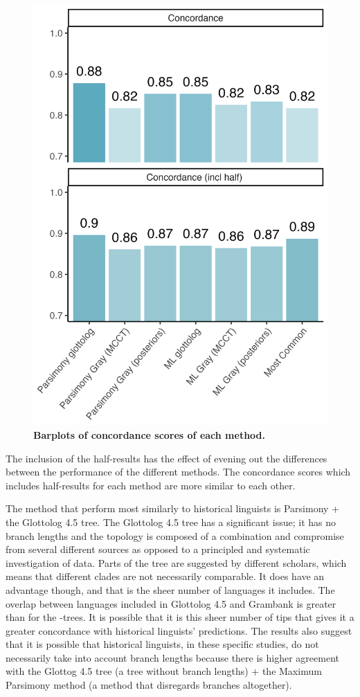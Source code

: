 \documentclass[12pt,letterpaper]{article}
\begin{document}
\begin{figure}[ht]
\centering
\includegraphics[width=12cm]{illustrations/plots_from_R/results/barplot_facet_scores_exclude_f1.png}
\caption{\textbf{Barplots of concordance scores of each method.}}
\label{barplot_facet_results}
\end{figure}

The inclusion of the half-results has the effect of evening out the differences between the performance of the different methods. The concordance scores which includes half-results for each method are more similar to each other.

The method that perform most similarly to historical linguists is Parsimony + the Glottolog 4.5 tree. The Glottolog 4.5 tree has a significant issue; it has no branch lengths and the topology is composed of a combination and compromise from several different sources as opposed to a principled and systematic investigation of  data. Parts of the tree are suggested by different scholars, which means that different clades are not necessarily comparable. It does have an advantage though, and that is the sheer number of languages it includes. The overlap between languages included in Glottolog 4.5 and Grambank is greater than for the \citet{grayetal_2009}-trees. It is possible that it is this sheer number of tips that gives it a greater concordance with historical linguists' predictions. The results also suggest that it is possible that historical linguists, in these specific studies, do not necessarily take into account branch lengths because there is higher agreement with the Glottog 4.5 tree (a tree without branch lengths) + the Maximum Parsimony method (a method that disregards branches altogether).
\end{document}
